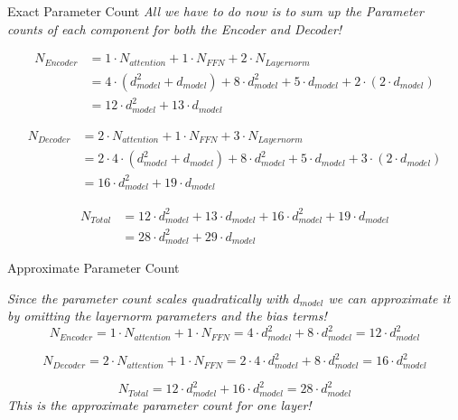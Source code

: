 \documentclass[11pt,compress,t,notes=noshow, xcolor=table]{beamer}
\begin{document}
\begin{frame}{Exact Parameter Count}
\textit{All we have to do now is to sum up the Parameter counts of each component for both the Encoder and Decoder!}

\begin{align*}
N_{Encoder} &= 1\cdot N_{attention} + 1\cdot N_{FFN} + 2\cdot N_{Layernorm} \\
&= 4\cdot(d_{model}^2 + d_{model}) + 8\cdot d_{model}^2 + 5\cdot d_{model} + 2\cdot(2\cdot d_{model}) \\
&= 12\cdot d_{model}^2 + 13 \cdot d_{model}
\end{align*}

\vspace{-.5cm}

\begin{align*}
N_{Decoder} &= 2\cdot N_{attention} + 1\cdot N_{FFN} + 3\cdot N_{Layernorm}\\
&= 2\cdot 4\cdot (d_{model}^2 + d_{model}) + 8\cdot d_{model}^2 + 5\cdot d_{model} + 3\cdot (2\cdot d_{model}) \\
&= 16\cdot d_{model}^2 + 19\cdot d_{model}
\end{align*}

\vspace{-.5cm}

\begin{align*}
N_{Total} &= 12\cdot d_{model}^2 + 13\cdot d_{model} + 16\cdot d_{model}^2 + 19\cdot d_{model} \\
&= 28\cdot d_{model}^2 + 29\cdot d_{model}
\end{align*}


\end{frame}

\begin{frame}{Approximate Parameter Count}

\textit{Since the parameter count scales quadratically with $d_{model}$ we can approximate it by omitting the layernorm parameters and the bias terms!} 
$$N_{Encoder} = 1\cdot N_{attention} + 1\cdot N_{FFN} = 4\cdot d_{model}^2 + 8\cdot d_{model}^2 = 12 \cdot d_{model}^2$$

$$N_{Decoder} = 2\cdot N_{attention} + 1\cdot N_{FFN} = 2\cdot 4\cdot d_{model}^2 + 8\cdot d_{model}^2 = 16\cdot d_{model}^2$$

$$N_{Total} = 12\cdot d_{model}^2 + 16\cdot d_{model}^2 = 28\cdot d_{model}^2$$
\vfill
\textit{This is the approximate parameter count for one layer!}

\end{frame}
\end{document}
